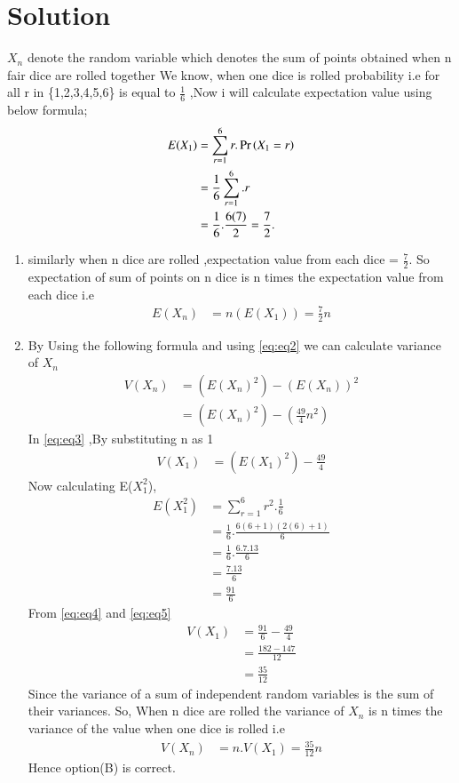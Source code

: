 \documentclass[journal,12pt,twocolumn]{IEEEtran}
\begin{document}
\section{Solution}
$X_{n}$ denote the random variable which denotes the sum of points obtained when n fair dice are rolled together
We know, when one dice is rolled probability i.e  for all r in \{1,2,3,4,5,6\} is equal to  $\frac{1}{6}$ ,Now i will calculate expectation value
using below formula;
\begin{align}
 E( X_{1})&=  \sum_{r=1}^6 r.\Pr\left(X_{1}=r\right)
 \label{eq:eq1}
\\
&=\frac{1}{6}\sum_{r=1}^6 .r
\\
&=\frac{1}{6}.\frac{6(7)}{2} =\frac{7}{2}.
\end{align}
\begin{enumerate}
\item similarly when n dice are rolled ,expectation value from each dice 
= $\frac{7}{2} $. 
So expectation of sum of points on n dice is n times the expectation value from each dice i.e
\begin{align}
    E(X_{n})& = n(E(X_{1})) =\frac{7}{2} n 
\label{eq:eq2}
\end{align}
\item By Using the following formula and using \eqref{eq:eq2}  we can calculate variance of  $X_{n}$ 
    \begin{align}
    V(X_{n})&=(E(X_{n})^{2}) - (E(X_{n}))^{2}
    \\
    &=(E(X_{n})^{2}) - (\frac{49}{4}n^{2})
    \label{eq:eq3}
    \end{align}
    In \eqref{eq:eq3} ,By substituting n as 1 
    \begin{align}
        V(X_{1})&=(E(X_{1})^{2}) - \frac{49}{4}
        \label{eq:eq4}
    \end{align}
    Now calculating E($X_{1}^{2}$),
    \begin{align}
      E(X_{1}^{2})&=\sum_{r=1}^6r^{2}.\frac{1}{6}
      \\
      &=\frac{1}{6}.\frac{6(6+1)(2(6)+1)}{6}
      \\
      &=\frac{1}{6}.\frac{6.7.13}{6}
      \\
      &=\frac{7.13}{6}
      \\
      &=\frac{91}{6}
      \label{eq:eq5}
    \end{align}
    From \eqref{eq:eq4} and \eqref{eq:eq5}
    \begin{align}
        V(X_{1})&=\frac{91}{6} -\frac{49}{4}
        \\
        &=\frac{182-147}{12}
        \\
        &=\frac{35}{12}
        \label{eq:eq6}
    \end{align}
    Since the variance of a sum of independent random variables is the sum of their variances. So, When n dice are rolled the variance of $X_{n}$ is n times the variance of the value when one dice is rolled i.e
    \begin{align}
        V(X_{n})&=n.V(X_{1}) = \frac{35}{12}n
    \end{align}
    Hence option(B) is correct.
\end{enumerate}
\end{document}

